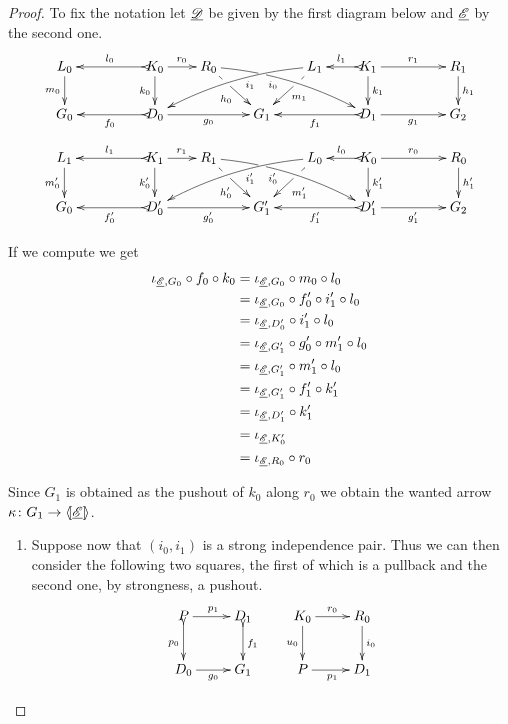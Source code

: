\begin{proof}
	To fix the notation let $\underline{\mathscr{D}}$ be given by the first diagram below and $\underline{\mathscr{E}}$ by the second one.
	\[\xymatrix@R=20pt@C=20pt{L_0 \ar[d]_{m_0}&& K_0
		\ar[d]_{k_0}\ar@{>->}[ll]_{l_0} \ar[r]^{r_0} & R_0
		\ar@{>}@/^.25cm/[drrr]|(.32)\hole_(.4){i_0}
		\ar[dr]|(.33)\hole_{h_0} && L_1 \ar@{>}@/_.25cm/[dlll]^(.4){i_1}
		\ar[dl]|(.33)\hole^{m_1}& K_1 \ar[d]^{k_1}\ar@{>->}[l]_{l_1}
		\ar[rr]^{r_1} && R_1 \ar[d]^{h_1}\\G_0 && \ar@{>->}[ll]^{f_0}
		D_0 \ar[rr]_{g_0}&& G_1 && \ar@{>->}[ll]^{f_1} D_1
		\ar[rr]_{g_1}&& G_2}
	\]
	\[
	\xymatrix@R=20pt@C=20pt{
		{L_1} \ar[d]_{m_0'}
		&&  {K_1} \ar@{>->}[ll]_{l_1} \ar[r]^{r_1} \ar[d]_{k_0'}
		&  {R_1} \ar[dr]|(.33)\hole_{h_0'}  \ar@/^.25cm/@{>}_(.4){i_0'}|(.32)\hole[drrr]
		& & 
		{L_0}\ar[dl]|(.33)\hole^{m_1'} \ar@/_.25cm/@{>}^(.4){i_1'}[dlll] 
		&  {K_0} \ar@{>->}[l]_{l_0} \ar[rr]^{r_0} \ar[d]^{k_1'}
		& & {R_0} \ar[d]^{h_1'} \\		
		{G_0}
		& & {D_0'} \ar@{>->}[ll]^{f_0'} \ar[rr]_{g_0'}
		& &  {G'_1} 
		& &  {D_1'} \ar@{>->}[ll]^{f_1'} \ar[rr]_{g_1'}
		& & {G_2}  }
	\]
	
	If we compute we get
	\begin{align*}
		\iota_{\underline{\mathscr{E}}, G_0}\circ f_{0}\circ  k_{0}&= \iota_{\underline{\mathscr{E}}, G_0}\circ m_{0} \circ l_{ 0}\\&=\iota_{\underline{\mathscr{E}}, G_0}\circ  f'_{0} \circ i'_1 \circ l_0\\&=\iota_{\underline{\mathscr{E}}, D'_0}\circ i'_1 \circ l_0\\&=\iota_{\underline{\mathscr{E}}, G'_1} \circ g'_0\circ m'_1 \circ l_0\\&=\iota_{\underline{\mathscr{E}}, G'_1}\circ m'_1\circ l_0	\\&=\iota_{\underline{\mathscr{E}}, G'_1} \circ f'_1\circ k'_1\\&=\iota_{\underline{\mathscr{E}}, D'_1}\circ k'_1\\&=\iota_{\underline{\mathscr{E}}, K'_0}\\&= \iota_{\underline{\mathscr{E}}, R_0} \circ r_0
	\end{align*}
	
Since $G_1$ is obtained as the pushout of $k_0$ along $r_0$ we obtain the wanted arrow $\kappa\colon G_1\to \langle \hspace{-1.85pt}[ \underline{\mathscr{E}}]\hspace{-1.85pt}\rangle$.
	
		

	\begin{enumerate}
		\item  Suppose now that $(i_0,i_1)$ is a strong independence pair. Thus we can then consider the following two squares, the first of which is a pullback and the second one, by strongness, a  pushout.
			\[\xymatrix{P \ar[r]^{p_1}  \ar@{>->}[d]_{p_0} & D_1 \ar@{>->}[d]^{f_1} & K_0 \ar[r]^{r_0}  \ar[d]_{u_0} & R_0 \ar[d]^{i_0}\\ D_0\ar[r]_{g_0} & G_1 & P\ar[r]_{p_1} & D_1}\]
		

\end{enumerate}
\end{proof}
